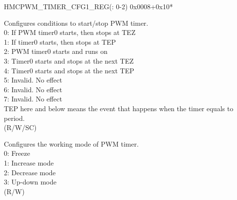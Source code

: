 \begin{register}{H}{MCPWM\_TIMER\_CFG1\_REG(: 0-2)}
{0x0008+0x10*}\label{regdesc:MCPWMTIMERNCFG1REG}
%
%
%
\regnewline%
\begin{regdesc}\begin{reglist}
\label{fielddesc:MCPWMTIMERNSTART}\item [MCPWM\_TIMER\regindex{n}\_START] Configures conditions to start/stop PWM timer. \\
0: If PWM timer0 starts, then stops at TEZ\\
1: If timer0 starts, then stops at TEP\\
2: PWM timer0 starts and runs on\\
3: Timer0 starts and stops at the next TEZ\\
4: Timer0 starts and stops at the next TEP\\
5: Invalid. No effect\\
6: Invalid. No effect\\
7: Invalid. No effect\\
TEP here and below means the event that happens when the timer equals to period. \\
(R/W/SC)
\label{fielddesc:MCPWMTIMERNMOD}\item [MCPWM\_TIMER\regindex{n}\_MOD] Configures the working mode of PWM timer. 
\\0: Freeze
\\1: Increase mode
\\2: Decrease mode
\\3: Up-down mode
\\(R/W)
\end{reglist}\end{regdesc}
\end{register}


